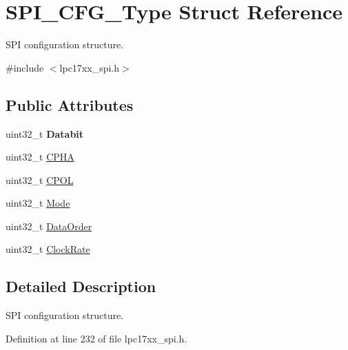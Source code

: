 \hypertarget{struct_s_p_i___c_f_g___type}{\section{\-S\-P\-I\-\_\-\-C\-F\-G\-\_\-\-Type \-Struct \-Reference}
\label{struct_s_p_i___c_f_g___type}
}


\-S\-P\-I configuration structure.  




{\ttfamily \#include $<$lpc17xx\-\_\-spi.\-h$>$}

\subsection*{\-Public \-Attributes}
\begin{DoxyCompactItemize}
\item 
\hypertarget{struct_s_p_i___c_f_g___type_af37375d8db287ac90a1bce734d299518}{uint32\-\_\-t {\bfseries \-Databit}}\label{struct_s_p_i___c_f_g___type_af37375d8db287ac90a1bce734d299518}

\item 
uint32\-\_\-t \hyperlink{struct_s_p_i___c_f_g___type_a6916f1b3bc90a2564ccbd8416f01f9e8}{\-C\-P\-H\-A}
\item 
uint32\-\_\-t \hyperlink{struct_s_p_i___c_f_g___type_ac19401364df01434ecc911f4b299ab42}{\-C\-P\-O\-L}
\item 
uint32\-\_\-t \hyperlink{struct_s_p_i___c_f_g___type_a2b9fcae208b172aa6e6a065142ec2e97}{\-Mode}
\item 
uint32\-\_\-t \hyperlink{struct_s_p_i___c_f_g___type_a969aaaaa1124d8885329bbad2e087cf8}{\-Data\-Order}
\item 
uint32\-\_\-t \hyperlink{struct_s_p_i___c_f_g___type_a27dd5b926ebaebf14115a7dba4cd8ebf}{\-Clock\-Rate}
\end{DoxyCompactItemize}


\subsection{\-Detailed \-Description}
\-S\-P\-I configuration structure. 

\-Definition at line 232 of file lpc17xx\-\_\-spi.\-h.



